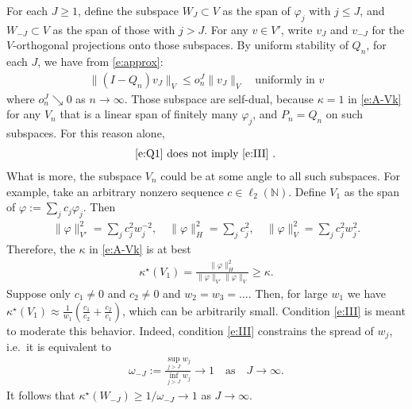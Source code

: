 \documentclass[12pt]{article}
\newcommand{\IN}{\mathbb{N}}
\newcommand{\norm}[2]{\|#1\|_{#2}}
\begin{document}
	For each $J \geq 1$,
	define the subspace $W_J \subset V$ as the span of 
	$\varphi_j$ with $j \leq J$,
	and
	$W_{-J} \subset V$ as the span of those with $j > J$.
	For any $v \in V'$, write $v_J$ and $v_{-J}$
	for the $V$-orthogonal projections onto those subspaces.
	By uniform stability of $Q_n$, 
	for each $J$,
	we have from \eqref{e:approx}:
	\begin{align}
		\label{e:QJ}
		\norm{(I - Q_n) v_J}{V}
		\leq
		o_n^J
		\norm{v_J}{V}
		\quad
		\text{uniformly in $v$}
	\end{align}
	where $o_n^J \searrow 0$ as $n \to \infty$.
	Those subspace are self-dual, 
	because
	$\kappa = 1$ in \eqref{e:A-Vk}
	for 
	any $V_n$ that is a linear span 
	of finitely many $\varphi_j$,
	and $P_n = Q_n$ on such subspaces.
	For this reason alone, 
	\begin{align}
		\text{
			\eqref{e:Q1}
			does not imply
			\eqref{e:III}
			.
		}
	\end{align}
	What is more, the subspace $V_n$
	could be at some angle to all such subspaces.
	For example, take an arbitrary nonzero sequence $c \in \ell_2(\IN)$.
	Define $V_1$ as the span of $\varphi := \sum_j c_j \varphi_j$.
	Then
	\begin{align}
		\textstyle
		\norm{\varphi}{V'}^2
		=
		\sum_j c_j^2 w_j^{-2}
		,
		\quad
		\norm{\varphi}{H}^2
		=
		\sum_j c_j^2
		,
		\quad
		\norm{\varphi}{V}^2
		=
		\sum_j c_j^2 w_j^2
		.
	\end{align}
	Therefore, the $\kappa$ in \eqref{e:A-Vk}
	is at best
	\begin{align}
		\kappa^\star
		(V_1)
		=
		\frac{
			\norm{\varphi}{H}^2
		}{
			\norm{\varphi}{V'}
			\norm{\varphi}{V}
		}
		\geq \kappa
		.
	\end{align}
	Suppose only $c_1 \neq 0$ and $c_2 \neq 0$
	and
	$w_2 = w_3 = \ldots$.
	Then, for large $w_1$ we have 
	$
		\kappa^\star(V_1) \approx \frac{1}{w_1}(\frac{c_1}{c_2} + \frac{c_2}{c_1})
	$,
	which can be arbitrarily small.
	Condition \eqref{e:III}
	is meant to moderate this behavior.
	Indeed, 
	condition \eqref{e:III} 
	constrains the spread of $w_j$,
	i.e.~it is equivalent to
	\begin{align}
		\label{e:spread}
		\omega_{-J}
		:=
		\frac{
			\sup_{j > J} w_j
		}{
			\inf_{j > J} w_j
		}
		\to 1
		\quad\text{as}\quad 
		J \to \infty
		.
	\end{align}
	It follows that
	$
		\kappa^\star(W_{-J}) \geq 1 / \omega_{-J}
		\to 1
	$
	as
	$J \to \infty$.
	
\end{document}
